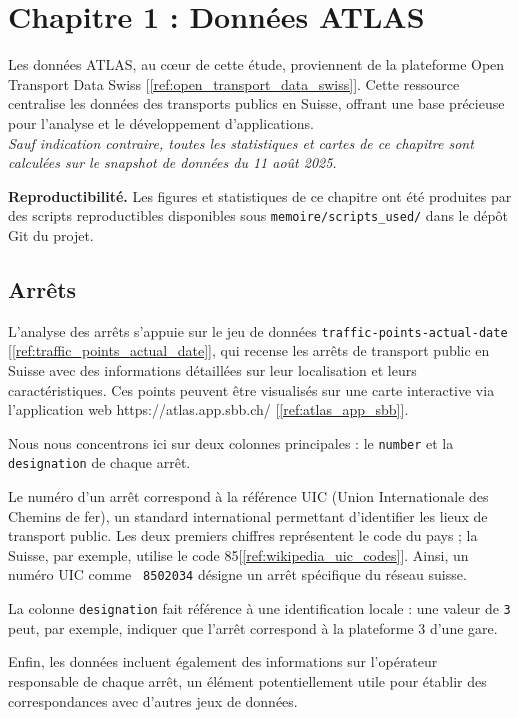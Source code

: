 \chapter{Chapitre 1 : Données ATLAS}

Les données ATLAS, au cœur de cette étude, proviennent de la plateforme Open Transport Data Swiss [\ref{ref:open_transport_data_swiss}]. Cette ressource centralise les données des transports publics en Suisse, offrant une base précieuse pour l’analyse et le développement d’applications.\\
\textit{Sauf indication contraire, toutes les statistiques et cartes de ce chapitre sont calculées sur le snapshot de données du 11 août 2025.}

\medskip
\noindent\textbf{Reproductibilité.} Les figures et statistiques de ce chapitre ont été produites par des scripts reproductibles disponibles sous \texttt{memoire/scripts\_used/} dans le dépôt Git du projet.

\section{Arrêts}

L'analyse des arrêts s'appuie sur le jeu de données \texttt{traffic-points-actual-date} [\ref{ref:traffic_points_actual_date}], qui recense les arrêts de transport public en Suisse avec des informations détaillées sur leur localisation et leurs caractéristiques. Ces points peuvent être visualisés sur une carte interactive via l’application web https://atlas.app.sbb.ch/ [\ref{ref:atlas_app_sbb}].

Nous nous concentrons ici sur deux colonnes principales : le \texttt{number} et la \texttt{designation} de chaque arrêt.

Le numéro d’un arrêt correspond à la référence UIC (Union Internationale des Chemins de fer), un standard international permettant d’identifier les lieux de transport public. Les deux premiers chiffres représentent le code du pays ; la Suisse, par exemple, utilise le code 85[\ref{ref:wikipedia_uic_codes}]. Ainsi, un numéro UIC comme \texttt{ 8502034} désigne un arrêt spécifique du réseau suisse.

La colonne \texttt{designation} fait référence à une identification locale : une valeur de \texttt{3} peut, par exemple, indiquer que l’arrêt correspond à la plateforme 3 d’une gare.

Enfin, les données incluent également des informations sur l’opérateur responsable de chaque arrêt, un élément potentiellement utile pour établir des correspondances avec d’autres jeux de données.


